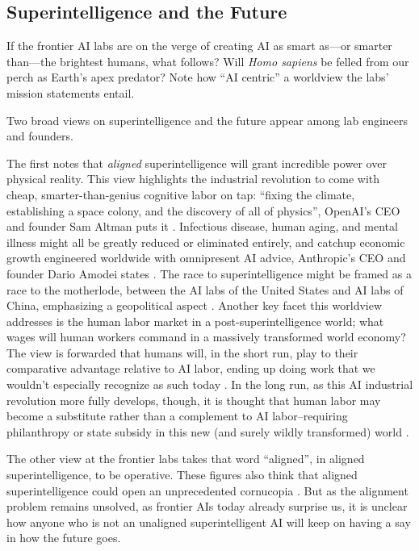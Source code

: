 \subsection{Superintelligence and the Future}
If the frontier AI labs are on the verge of creating AI as smart as---or
smarter than---the brightest humans, what follows? Will \emph{Homo sapiens} be
felled from our perch as Earth's apex predator? Note how ``AI centric'' a
worldview the labs' mission statements entail.

Two broad views on superintelligence and the future appear among lab engineers
and founders.

The first notes that \emph{aligned} superintelligence will grant incredible
power over physical reality. This view highlights the industrial revolution to
come with cheap, smarter-than-genius cognitive labor on tap: ``fixing the
climate, establishing a space colony, and the discovery of all of physics'',
OpenAI's CEO and founder Sam Altman puts it \cite{altman2024intelligence}.
Infectious disease, human aging, and mental illness might all be greatly
reduced or eliminated entirely, and catchup economic growth engineered
worldwide with omnipresent AI advice, Anthropic's CEO and founder Dario Amodei
states \cite{amodei2024grace}. The race to superintelligence might be framed as
a race to the motherlode, between the AI labs of the United States and AI labs
of China, emphasizing a geopolitical aspect
\cite{aschenbrenner2024situational,amodei2024grace}. Another key facet this
worldview addresses is the human labor market in a post-superintelligence
world; what wages will human workers command in a massively transformed world
economy? The view is forwarded that humans will, in the short run, play to
their comparative advantage relative to AI labor, ending up doing work that we
wouldn't especially recognize as such today
\cite{altman2024intelligence,amodei2024grace}. In the long run, as this AI
industrial revolution more fully develops, though, it is thought that human
labor may become a substitute rather than a complement to AI labor--requiring
philanthropy or state subsidy in this new (and surely wildly transformed) world
\cite{amodei2024grace}.

The other view at the frontier labs takes that word ``aligned'', in aligned
superintelligence, to be operative. These figures also think that aligned
superintelligence could open an unprecedented cornucopia
\cite{bostrom2014superintelligence,bostrom2024utopia}. But as the alignment
problem remains unsolved, as frontier AIs today already surprise us, it is
unclear how anyone who is not an unaligned superintelligent AI will keep on
having a say in how the future goes.
